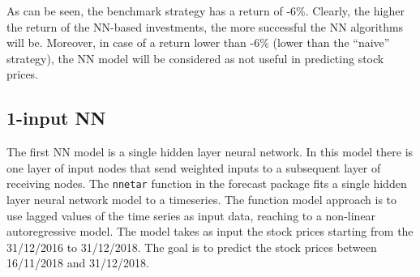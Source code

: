 \documentclass[
  11pt,
]{article}
\begin{document}
\begin{table}[H]

\caption{\label{tab:benchmark2}Benchmark strategy outcome}
\centering
{}
\end{table}

As can be seen, the benchmark strategy has a return of -6\%. Clearly,
the higher the return of the NN-based investments, the more successful
the NN algorithms will be. Moreover, in case of a return lower than -6\%
(lower than the ``naive'' strategy), the NN model will be considered as
not useful in predicting stock prices.

\hypertarget{input-nn}{%
\subsection{1-input NN}\label{input-nn}}

The first NN model is a single hidden layer neural network. In this
model there is one layer of input nodes that send weighted inputs to a
subsequent layer of receiving nodes. The \texttt{nnetar} function in the
forecast package fits a single hidden layer neural network model to a
timeseries. The function model approach is to use lagged values of the
time series as input data, reaching to a non-linear autoregressive
model. The model takes as input the stock prices starting from the
31/12/2016 to 31/12/2018. The goal is to predict the stock prices
between 16/11/2018 and 31/12/2018.
\end{document}
